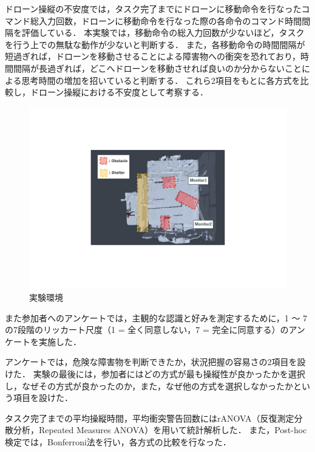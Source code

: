 \documentclass[a4paper,11pt]{ujreport}
\begin{document}
ドローン操縦の不安度では，タスク完了までにドローンに移動命令を行なったコマンド総入力回数，ドローンに移動命令を行なった際の各命令のコマンド時間間隔を評価している．
本実験では，移動命令の総入力回数が少ないほど，タスクを行う上での無駄な動作が少ないと判断する．
また，各移動命令の時間間隔が短過ぎれば，ドローンを移動させることによる障害物への衝突を恐れており，時間間隔が長過ぎれば，どこへドローンを移動させれば良いのか分からないことによる思考時間の増加を招いていると判断する．
これら2項目をもとに各方式を比較し，ドローン操縦における不安度として考察する．

\begin{figure}[!tb]
  \centering
  \includegraphics[width=0.7\linewidth]{img/05_experiment.pdf}
  \caption{実験環境}
  \label{fig:05_experiment}
\end{figure}


\par
また参加者へのアンケートでは，主観的な認識と好みを測定するために，1 〜 7 の7段階のリッカート尺度（1 = 全く同意しない，7 = 完全に同意する）のアンケートを実施した．
\par
アンケートでは，危険な障害物を判断できたか，状況把握の容易さの2項目を設けた．
実験の最後には，参加者にはどの方式が最も操縦性が良かったかを選択し，なぜその方式が良かったのか，また，なぜ他の方式を選択しなかったかという項目を設けた．
\par
タスク完了までの平均操縦時間，平均衝突警告回数にはrANOVA（反復測定分散分析，Repeated Measures ANOVA）を用いて統計解析した．
また，Post-hoc検定では，Bonferroni法を行い，各方式の比較を行なった．
    
\end{document}
